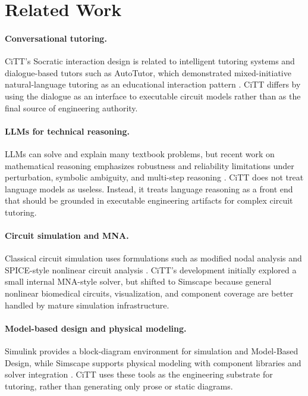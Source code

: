 \section{Related Work}

\paragraph{Conversational tutoring.}
CiTT's Socratic interaction design is related to intelligent tutoring systems and dialogue-based tutors such as AutoTutor, which demonstrated mixed-initiative natural-language tutoring as an educational interaction pattern \cite{graesser_autotutor_2001}. CiTT differs by using the dialogue as an interface to executable circuit models rather than as the final source of engineering authority.

\paragraph{LLMs for technical reasoning.}
LLMs can solve and explain many textbook problems, but recent work on mathematical reasoning emphasizes robustness and reliability limitations under perturbation, symbolic ambiguity, and multi-step reasoning \cite{llm_math_reasoning_survey}. CiTT does not treat language models as useless. Instead, it treats language reasoning as a front end that should be grounded in executable engineering artifacts for complex circuit tutoring.

\paragraph{Circuit simulation and MNA.}
Classical circuit simulation uses formulations such as modified nodal analysis and SPICE-style nonlinear circuit analysis \cite{ho_mna_1975,nagel_rohrer_1971}. CiTT's development initially explored a small internal MNA-style solver, but shifted to Simscape because general nonlinear biomedical circuits, visualization, and component coverage are better handled by mature simulation infrastructure.

\paragraph{Model-based design and physical modeling.}
Simulink provides a block-diagram environment for simulation and Model-Based Design, while Simscape supports physical modeling with component libraries and solver integration \cite{mathworks_simulink,mathworks_simscape,mathworks_simscape_electrical}. CiTT uses these tools as the engineering substrate for tutoring, rather than generating only prose or static diagrams.

